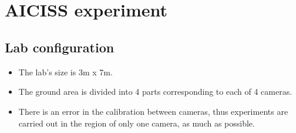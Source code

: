\documentclass[paper=a4, fontsize=11pt]{scrartcl} %
\title{\hmwkClass \\
       \hmwkTitle}
\author{\hmwkAuthorFullName}
\date{\hmwkDueDate}
\begin{document}
    \maketitle
    \thispagestyle{fancy} %
    
    \section{AICISS experiment}
    \subsection{Lab configuration}
    \begin{itemize}
	    \item The lab's size is 3m x 7m.
	    \item The ground area is divided into 4 parts corresponding to each of 4 cameras.
	    \item There is an error in the calibration between cameras, thus experiments are carried out in the region of only one camera, as much as possible.
    \end{itemize}
\end{document}
